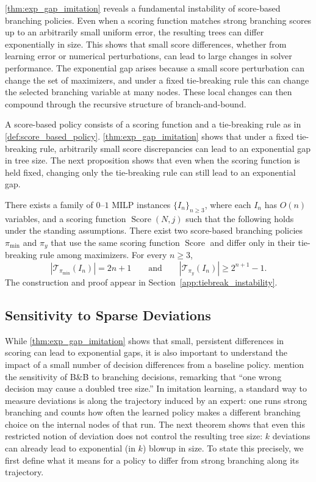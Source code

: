 \documentclass[smallextended,envcountsect]{svjour3} %
\newcommand{\Tcal}{\mathcal{T}}
\newcommand{\0}{\mathbf{0}}
\DeclareMathOperator{\Score}{Score} %
\newcommand{\1}{\mathbf{1}} %
\begin{document}
\cref{thm:exp_gap_imitation} reveals a fundamental instability of score-based branching policies. Even when a scoring function matches strong branching scores up to an arbitrarily small uniform error, the resulting trees can differ exponentially in size. This shows that small score differences, whether from learning error or numerical perturbations, can lead to large changes in solver performance. The exponential gap arises because a small score perturbation can change the set of maximizers, and under a fixed tie-breaking rule this can change the selected branching variable at many nodes. These local changes can then compound through the recursive structure of branch-and-bound.

A score-based policy consists of a scoring function and a tie-breaking rule as in \cref{def:score_based_policy}.
\cref{thm:exp_gap_imitation} shows that under a fixed tie-breaking rule, arbitrarily small score discrepancies can lead to an exponential gap in tree size.
The next proposition shows that even when the scoring function is held fixed, changing only the tie-breaking rule can still lead to an exponential gap.
\begin{proposition}\label{prop:tiebreak_instability}
	There exists a family of $0$--$1$ MILP instances $\{I_n\}_{n \ge 3}$, where each $I_n$ has $O(n)$ variables, and a scoring function $\Score(N,j)$ such that the following holds under the standing assumptions.
	There exist two score-based branching policies $\pi_{\min}$ and $\pi_y$ that use the same scoring function $\Score$ and differ only in their tie-breaking rule among maximizers.
	For every $n\ge 3$,
	\[
		|\Tcal_{\pi_{\min}}(I_n)| = 2n+1
		\qquad\text{and}\qquad
		|\Tcal_{\pi_y}(I_n)| \ge 2^{n+1}-1.
	\]
	The construction and proof appear in Section~\ref{app:tiebreak_instability}.
\end{proposition}

\subsection{Sensitivity to Sparse Deviations}

While \cref{thm:exp_gap_imitation} shows that small, persistent differences in scoring can lead to exponential gaps, it is also important to understand the impact of a small number of decision differences from a baseline policy. \citet{ye2023gnn} mention the sensitivity of B\&B to branching decisions, remarking that ``one wrong decision may cause a doubled tree size.'' In imitation learning, a standard way to measure deviations is along the trajectory induced by an expert: one runs strong branching and counts how often the learned policy makes a different branching choice on the internal nodes of that run.
The next theorem shows that even this restricted notion of deviation does not control the resulting tree size: $k$ deviations can already lead to exponential (in $k$) blowup in size. To state this precisely, we first define what it means for a policy to differ from strong branching along its trajectory.
\end{document}

